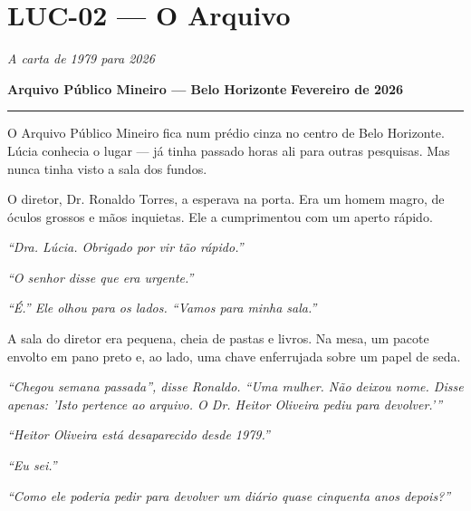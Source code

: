 \section*{\textbf{LUC-02} --- O Arquivo}

\noindent \textit{A carta de 1979 para 2026}

\noindent \textbf{Arquivo Público Mineiro --- Belo Horizonte}
\textbf{Fevereiro de 2026}

\vspace{0.5em}\noindent\rule{\textwidth}{0.5pt}\vspace{0.5em}

\noindent O Arquivo Público Mineiro fica num prédio cinza no centro de Belo Horizonte. Lúcia conhecia o lugar --- já tinha passado horas ali para outras pesquisas. Mas nunca tinha visto a sala dos fundos.

\noindent O diretor, Dr. Ronaldo Torres, a esperava na porta. Era um homem magro, de óculos grossos e mãos inquietas. Ele a cumprimentou com um aperto rápido.

\noindent \textit{\textquotedblleft{}Dra. Lúcia. Obrigado por vir tão rápido.\textquotedblright{}}

\noindent \textit{\textquotedblleft{}O senhor disse que era urgente.\textquotedblright{}}

\noindent \textit{\textquotedblleft{}É.\textquotedblright{}\textit{ Ele olhou para os lados. }\textquotedblleft{}Vamos para minha sala.\textquotedblright{}}

\noindent A sala do diretor era pequena, cheia de pastas e livros. Na mesa, um pacote envolto em pano preto e, ao lado, uma chave enferrujada sobre um papel de seda.

\noindent \textit{\textquotedblleft{}Chegou semana passada\textquotedblright{}\textit{, disse Ronaldo. }\textquotedblleft{}Uma mulher. Não deixou nome. Disse apenas: 'Isto pertence ao arquivo. O Dr. Heitor Oliveira pediu para devolver.'\textquotedblright{}}

\noindent \textit{\textquotedblleft{}Heitor Oliveira está desaparecido desde 1979.\textquotedblright{}}

\noindent \textit{\textquotedblleft{}Eu sei.\textquotedblright{}}

\noindent \textit{\textquotedblleft{}Como ele poderia pedir para devolver um diário quase cinquenta anos depois?\textquotedblright{}}

